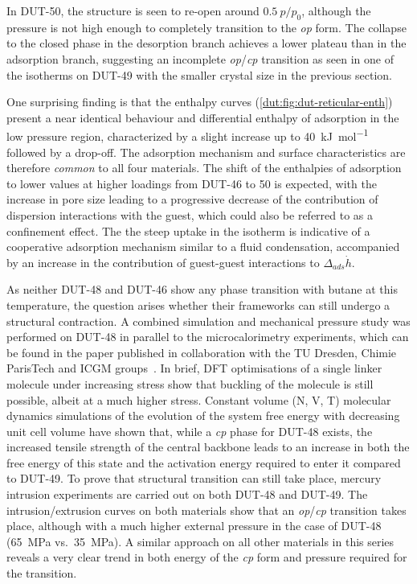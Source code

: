 In DUT-50, the structure is seen to re-open around \(0.5~p/p_0\), although 
the pressure is not high enough to completely transition to the
\textit{op} form. The collapse to the closed phase in the desorption
branch achieves a lower plateau than in the adsorption branch,
suggesting an incomplete \textit{op}/\textit{cp} transition as seen in one 
of the isotherms on DUT-49 with the smaller crystal size in the previous
section.

One surprising finding is that the enthalpy curves 
(\autoref{dut:fig:dut-reticular-enth}) present a near
identical behaviour and differential enthalpy of adsorption in the 
low pressure region, characterized by a slight increase up to 
\SI{40}{\kilo\joule\per\mol} followed by a drop-off. The adsorption
mechanism and surface characteristics are therefore \textit{common} to 
all four materials. The shift of the enthalpies of adsorption to lower 
values at higher loadings from DUT-46 to 50 is expected, with the increase
in pore size leading to a progressive decrease of the contribution 
of dispersion interactions with the guest, which could also be 
referred to as a confinement effect. The the steep uptake in the isotherm
is indicative of a cooperative adsorption mechanism similar to a fluid
condensation, accompanied by an increase in the contribution of 
guest-guest interactions to \(\Delta_{ads} \dot{h}\).

As neither DUT-48 and DUT-46 show any phase transition with
butane at this temperature, the question arises whether their frameworks
can still undergo a structural contraction. A combined simulation and 
mechanical pressure study was performed on DUT-48 in parallel to the 
microcalorimetry experiments, which can be found in the paper 
published in collaboration with the TU Dresden, Chimie ParisTech and 
ICGM groups~\cite{krauseAdsorptionContractionMechanics2018}.
In brief, DFT optimisations of a single linker molecule under increasing
stress show that buckling of the molecule is still possible, albeit
at a much higher stress. Constant volume (N, V, T) molecular dynamics
simulations of the evolution of the system free energy with decreasing
unit cell volume have shown that, while a \textit{cp} phase for DUT-48
exists, the increased tensile strength of the central backbone leads
to an increase in both the free energy of this state and the activation
energy required to enter it compared to DUT-49. To prove that structural
transition can still take place, mercury intrusion experiments are 
carried out on both DUT-48 and DUT-49. The intrusion/extrusion 
curves on both materials show that an \textit{op}/\textit{cp} transition takes
place, although with a much higher external pressure in the case 
of DUT-48 (\SI{65}{\mega\pascal} vs.\ \SI{35}{\mega\pascal}). A similar 
approach on all other materials in this series reveals a very clear
trend in both energy of the \textit{cp} form and pressure required 
for the transition.


